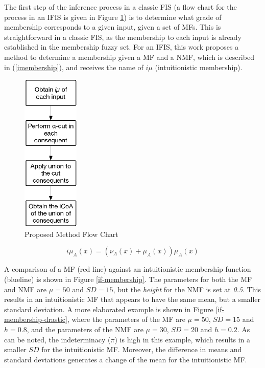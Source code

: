 \documentclass[conference]{IEEEtran}
\begin{document}
The first step of the inference process in a classic FIS (a flow chart
for the process in an IFIS is given in Figure \ref{flow-chart}) is to
determine what grade of membership corresponds to a given input, given a set of
MFs. This is straightforward in a classic FIS, as the
membership to each input is already established in the membership
fuzzy set. For an IFIS, this work proposes a method to determine a
membership given a MF and a NMF,
which is described in (\ref{imembership}), and receives the name of
$i\mu$ (intuitionistic membership). %

\begin{figure}[!t]
  \centering
  \includegraphics[height=3.0in]{proposed-method-flow-chart.eps}
  \caption{Proposed Method Flow Chart}
  \label{flow-chart}
\end{figure}

\begin{equation}
  \label{imembership}
  i\mu_{A}(x) = (\nu_{A}(x) + \mu_{A}(x))\mu_{A}(x)
\end{equation}

A comparison of a MF (red line) against an intuitionistic
membership function (blueline) is shown in Figure
\ref{if-membership}. The parameters for both the MF and NMF are $\mu =
50$ and $SD = 15$, but the \textit{height} for the NMF is set at \textit{0.5}. This
results in an intuitionistic MF that appears to have the same mean,
but a smaller standard deviation. A more elaborated example is shown
in Figure \ref{if-membership-drastic}, where the parameters of the MF
are $\mu = 50$, $SD = 15$ and $h = 0.8$, and the parameters of the NMF
are $\mu = 30$, $SD = 20$ and $h = 0.2$. As can be noted, the
indeterminacy ($\pi$) is high in this example, which results in a
smaller $SD$ for the intuitionistic MF. Moreover, the difference in
means and standard deviations generates a change of the mean for the
intuitionistic MF.
\end{document}

